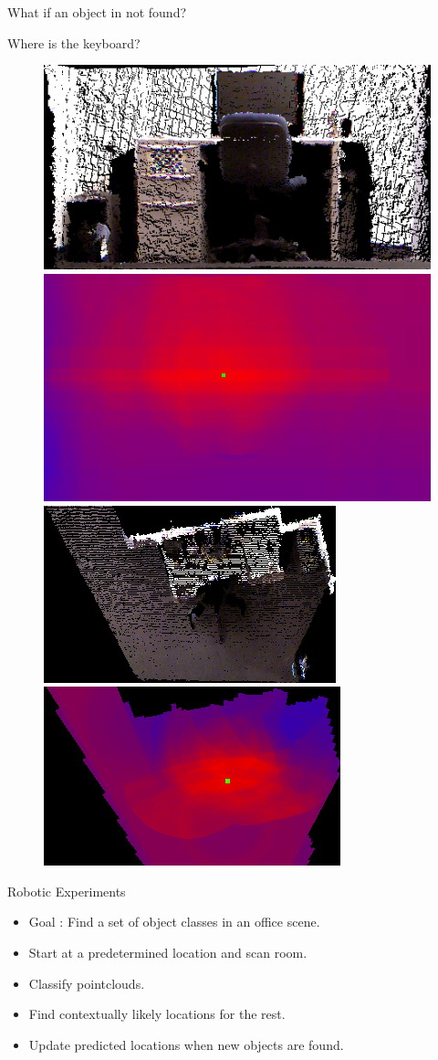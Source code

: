 \documentclass{beamer}
\begin{document}
\begin{frame}{What if an object in not found?}
\begin{center}
Where is the keyboard?
 \begin{figure}   
\includegraphics[width=0.5\linewidth]{frontCropped.png}
\includegraphics[width=0.5\linewidth]{frontHeatCropped.png} \\
\includegraphics[width=0.5\linewidth]{topCropped.png}
\includegraphics[width=0.5\linewidth]{topHeatCropped.png} \\
 \end{figure}
 \end{center}
\end{frame}


\begin{frame}{Robotic Experiments}

\begin{itemize}
\item Goal : Find a set of object classes in an office scene.
\item Start at a predetermined location and scan room. 
\item Classify pointclouds. 
\item Find contextually likely locations for the rest.
\item Update predicted locations when new objects are found.
\end{itemize}

\end{frame}
\end{document}

